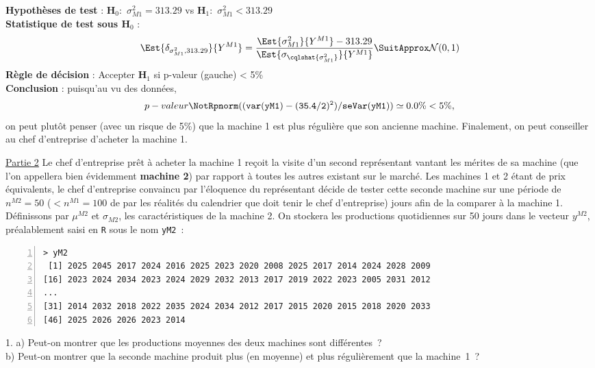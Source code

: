 \documentclass[10pt]{report}
\begin{document}
\begin{exercice}
\begin{Correction}
\noindent \textbf{Hypothèses de test} : $\mathbf{H}_0:$ $\sigma^2_{M1}=313.29$ vs {\large $\mathbf{H}_1:$ $\sigma^2_{M1}<313.29$}\\
\textbf{Statistique de test sous $\mathbf{H}_0$} :
  $$
  \Est{\delta_{\sigma^2_{M1},313.29}}{Y^{M1}}= {\displaystyle \frac{\Est{\sigma^2_{M1}}{Y^{M1}}-313.29}{
\Est{\sigma_{\cqlshat{\sigma^2_{M1}}}}{Y^{M1}}
}} 
  \SuitApprox \mathcal{N}(0,1)
  $$
\textbf{Règle de décision} : Accepter $\mathbf{H}_1$ si 
  p-valeur (gauche) < 5\%\\
\noindent \textbf{Conclusion} :
puisqu'au vu des données, 
  \[
p-valeur\NotR\mathtt{pnorm((var(yM1)-(35.4/2)^2)/seVar(yM1))} \simeq 0.0\% < 5\%,
\]
on peut plutôt penser (avec un risque de 5\%) que la machine 1 est plus régulière que son ancienne machine.
Finalement, on peut conseiller au chef d'entreprise d'acheter la machine 1.
\end{Correction}


\noindent \underline{Partie 2} Le chef d'entreprise pr{\^e}t {\`a} acheter la machine 1 re{\c c}oit la visite d'un second repr{\'e}sentant vantant les m{\'e}rites de sa machine (que l'on appellera bien {\'e}videmment \textbf{machine 2}) par rapport {\`a} toutes les autres existant sur le march{\'e}. Les machines 1 et 2 {\'e}tant de prix {\'e}quivalents, le chef d'entreprise convaincu par l'{\'e}loquence du repr{\'e}sentant d{\'e}cide de tester cette seconde machine sur une p{\'e}riode de $n^{M2}=50$ ($<n^{M1}=100$ de par les r{\'e}alit{\'e}s du calendrier que doit tenir le chef d'entreprise) jours afin de la comparer {\`a} la machine 1. \\
D{\'e}finissons par $\mu^{M2}$ et $\sigma_{M2}$, les caract{\'e}ristiques de la machine 2. On stockera les productions quotidiennes sur 50 jours dans le vecteur $y^{M2}$, pr{\'e}alablement saisi en \texttt{R} sous le nom \texttt{yM2}~:
\begin{Verbatim}[frame=leftline,fontfamily=tt,fontshape=n,numbers=left]
> yM2
 [1] 2025 2045 2017 2024 2016 2025 2023 2020 2008 2025 2017 2014 2024 2028 2009
[16] 2023 2024 2034 2023 2024 2029 2032 2013 2017 2019 2022 2023 2005 2031 2012
...
[31] 2014 2032 2018 2022 2035 2024 2034 2012 2017 2015 2020 2015 2018 2020 2033
[46] 2025 2026 2026 2023 2014
\end{Verbatim}


1. a) Peut-on montrer que les productions moyennes des deux machines sont diff{\'e}rentes~?\\
b) Peut-on montrer que la seconde machine produit plus (en moyenne) et plus r{\'e}guli{\`e}rement que la machine~1~?


\end{exercice}
\end{document}
